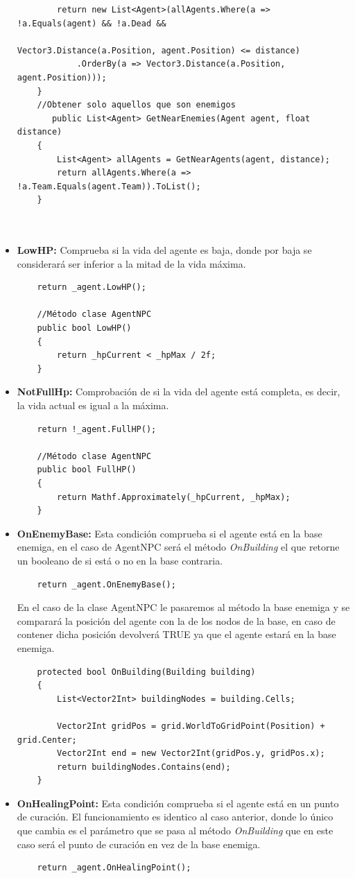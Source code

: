 \begin{itemize}
\begin{lstlisting}
        return new List<Agent>(allAgents.Where(a => !a.Equals(agent) && !a.Dead &&
                                                    Vector3.Distance(a.Position, agent.Position) <= distance)
            .OrderBy(a => Vector3.Distance(a.Position, agent.Position)));
    }
    //Obtener solo aquellos que son enemigos
       public List<Agent> GetNearEnemies(Agent agent, float distance)
    {
        List<Agent> allAgents = GetNearAgents(agent, distance);
        return allAgents.Where(a => !a.Team.Equals(agent.Team)).ToList();
    }
    
    
    \end{lstlisting}
    \item \textbf{LowHP:} Comprueba si la vida del agente es baja, donde por baja se considerará ser inferior a la mitad de la vida máxima.
    \begin{lstlisting}
    return _agent.LowHP();
    
    //Método clase AgentNPC
    public bool LowHP()
    {
        return _hpCurrent < _hpMax / 2f;
    }
    \end{lstlisting}
    
    \item \textbf{NotFullHp:} Comprobación de si la vida del agente está completa, es decir, la vida actual es igual a la máxima.
    \begin{lstlisting}
    return !_agent.FullHP();
    
    //Método clase AgentNPC
    public bool FullHP()
    {
        return Mathf.Approximately(_hpCurrent, _hpMax);
    }
    \end{lstlisting}
    \item \textbf{OnEnemyBase:} Esta condición comprueba si el agente está en la base enemiga, en el caso de AgentNPC será el método \textit{OnBuilding} el que retorne un booleano de si está o no en la base contraria.
    \begin{lstlisting}
    return _agent.OnEnemyBase();
    \end{lstlisting}
    En el caso de la clase AgentNPC le pasaremos al método la base enemiga y se comparará la posición del agente con la de los nodos de la base, en caso de contener dicha posición devolverá TRUE ya que el agente estará en la base enemiga.
    \begin{lstlisting}
    protected bool OnBuilding(Building building)
    {
        List<Vector2Int> buildingNodes = building.Cells;
        
        Vector2Int gridPos = grid.WorldToGridPoint(Position) + grid.Center;
        Vector2Int end = new Vector2Int(gridPos.y, gridPos.x);
        return buildingNodes.Contains(end);
    }
    \end{lstlisting}
    \item \textbf{OnHealingPoint:} Esta condición comprueba si el agente está en un punto de curación. El funcionamiento es identico al caso anterior, donde lo único que cambia es el parámetro que se pasa al método \textit{OnBuilding} que en este caso será el punto de curación en vez de la base enemiga.
    \begin{lstlisting}
    return _agent.OnHealingPoint();
    \end{lstlisting}


\end{itemize}
